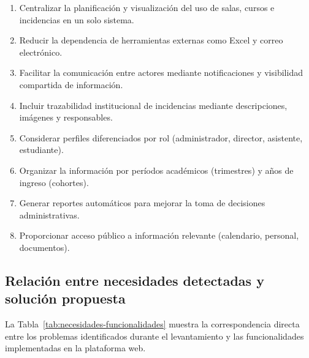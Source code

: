 \begin{enumerate}
    \item Centralizar la planificación y visualización del uso de salas, cursos e incidencias en un solo sistema.
    \item Reducir la dependencia de herramientas externas como Excel y correo electrónico.
    \item Facilitar la comunicación entre actores mediante notificaciones y visibilidad compartida de información.
    \item Incluir trazabilidad institucional de incidencias mediante descripciones, imágenes y responsables.
    \item Considerar perfiles diferenciados por rol (administrador, director, asistente, estudiante).
    \item Organizar la información por períodos académicos (trimestres) y años de ingreso (cohortes).
    \item Generar reportes automáticos para mejorar la toma de decisiones administrativas.
    \item Proporcionar acceso público a información relevante (calendario, personal, documentos).
\end{enumerate}

\subsection{Relación entre necesidades detectadas y solución propuesta}

La Tabla~\ref{tab:necesidades-funcionalidades} muestra la correspondencia directa entre los problemas identificados durante el levantamiento y las funcionalidades implementadas en la plataforma web.

